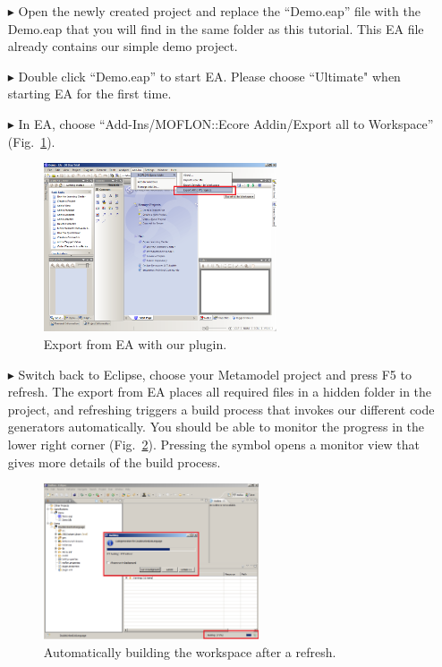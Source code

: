 \begin{enumerate}
\item[$\blacktriangleright$] Open the newly created project and replace the
``Demo.eap'' file with the Demo.eap that you will find in the
same folder as this tutorial. 
This EA file already contains our simple demo project.

\item[$\blacktriangleright$] Double click ``Demo.eap'' to start EA.
Please choose ``Ultimate" when starting EA for the first time.

\item[$\blacktriangleright$] In EA, choose ``Add-Ins/MOFLON::Ecore Addin/Export
all to Workspace'' (Fig.~\ref{fig_ea}).
\begin{figure}[!h]
	\centering
  \includegraphics[width=0.65\textwidth]{pics/ea_firststart.png}
	\caption{Export from EA with our plugin.}
	\label{fig_ea}
\end{figure}

\newpage

\item[$\blacktriangleright$] Switch back to Eclipse, choose your Metamodel
project and press F5 to refresh.
The export from EA places all required files in a hidden folder in the
project, and refreshing triggers a build process that invokes our different
code generators automatically.
You should be able to monitor the progress in the lower right corner
(Fig.~\ref{fig_eclipsebuilding}).  
Pressing the symbol opens a monitor view that gives more details of the build
process. 
\begin{figure}[!h]
	\centering
  \includegraphics[width=0.6\textwidth]{pics/eclipse_building.png}
	\caption{Automatically building the workspace after a refresh.}
	\label{fig_eclipsebuilding}
\end{figure}
\end{enumerate}


